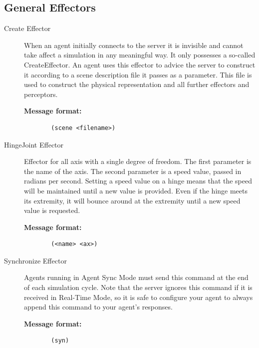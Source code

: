 \subsection{General Effectors}
\begin{description}
  \item [Create Effector]
  When an agent initially connects to the server it is invisible and cannot take affect a simulation in any meaningful way. It only possesses a so-called CreateEffector. An agent uses this effector to advice the server to construct it according to a scene description file it passes as a parameter. This file is used to construct the physical representation and all further effectors and perceptors.\cite{SimSpark}
  \begin{description}
  \item[{\bf Message format:}]
  \begin{verbatim}
  (scene <filename>)
  \end{verbatim}
  \end{description}

  \item [HingeJoint Effector]
  Effector for all axis with a single degree of freedom. The first parameter is the name of the axis. The second parameter is a speed value, passed in radians per second. Setting a speed value on a hinge means that the speed will be maintained until a new value is provided. Even if the hinge meets its extremity, it will bounce around at the extremity until a new speed value is requested.\cite{SimSpark}
  \begin{description}
  \item[{\bf Message format:}]
  \begin{verbatim}
  (<name> <ax>)
  \end{verbatim}
  \end{description}

  \item [Synchronize Effector]
  Agents running in Agent Sync Mode must send this command at the end of each simulation cycle. Note that the server ignores this command if it is received in Real-Time Mode, so it is safe to configure your agent to always append this command to your agent's responses.\cite{SimSpark}
  \begin{description}
  \item[{\bf Message format:}]
  \begin{verbatim}
  (syn)
  \end{verbatim}
  \end{description}

\end{description}


